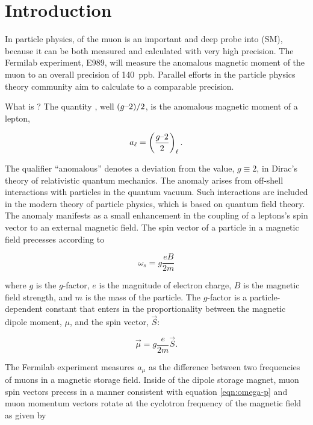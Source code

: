 \chapter {Introduction} \label{ch:intro}

In particle physics, \gmtwo of the muon is an important and deep probe into \tsm (SM), because it can be both measured and calculated with very high precision.  The Fermilab \gmtwo experiment, E989, will measure the anomalous magnetic moment of the muon to an overall precision of \SI{140}{ppb}.  Parallel efforts in the particle physics theory community aim to calculate \mugmtwo to a comparable precision.

What is \gmtwo?  The quantity \gmtwo, well $(g\hbox{--}2)/2$, is the anomalous magnetic moment of a lepton,

\begin{equation}
\label{eqn:amm-lepton}
a_\ell = \left(\frac{g\hbox{--}2}{2}\right)_\ell.
\end{equation}

\noindent
The qualifier ``anomalous'' denotes a deviation from the value, $g \equiv 2$, in Dirac's theory of relativistic quantum mechanics.  The anomaly arises from off-shell interactions with particles in the quantum vacuum.  Such interactions are included in the modern theory of particle physics, which is based on quantum field theory.  The anomaly manifests as a small enhancement in the coupling of a leptons's spin vector to an external magnetic field.  The spin vector of a particle in a magnetic field precesses according to 

\begin{equation}
\label{eqn:omega-p}
\omega_{s} = g \frac{e B}{2 m}
\end{equation}

\noindent
where $g$ is the $g$-factor, $e$ is the magnitude of electron charge, $B$ is the magnetic field strength, and $m$ is the mass of the particle.  The $g$-factor is a particle-dependent constant that enters in the proportionality between the magnetic dipole moment, $\mu$, and the spin vector, $\vec{S}$:

\begin{equation}
\label{eqn:muon-mu}
\vec{\mu} = g \frac{e}{2 m} \vec{S}.
\end{equation}

The Fermilab \gmtwo experiment measures $a_\mu$ as the difference between two frequencies of muons in a magnetic storage field.  Inside of the dipole storage magnet, muon spin vectors precess in a manner consistent with equation \ref{eqn:omega-p} and muon momentum vectors rotate at the cyclotron frequency of the magnetic field as given by

